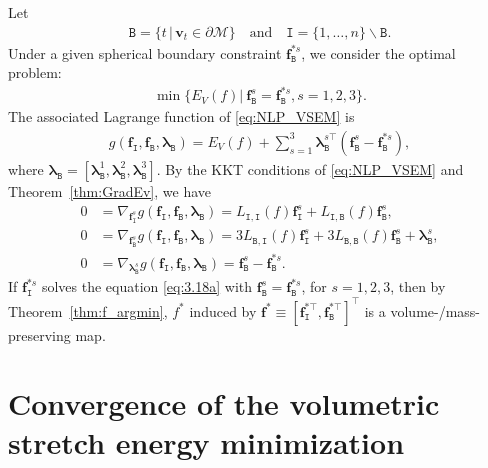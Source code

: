 \documentclass[onefignum,onetabnum]{siamonline220329}
\numberwithin{equation}{section}
\def\f{\mathbf{f}}
\def\bv{\mathbf{v}}
\def\I{\mathtt{I}}
\def\B{\mathtt{B}}
\def\blam{{\boldsymbol{\lambda}}}
\begin{document}
\begin{sloppypar}
Let
\begin{align*}
\mathtt{B} = \{t \,|\, \bv_t\in\partial\mathcal{M}\}\quad\text{and}\quad \mathtt{I} = \{1, \ldots, n\} \backslash\mathtt{B}.
\end{align*}
Under a given spherical boundary constraint $\f^{*s}_{\B}$, we consider the optimal problem:
\begin{align}\label{eq:NLP_VSEM}
    \min\{E_V(f)\rvert\  \f^s_\B = \f^{*s}_{\B}, s=1, 2, 3\}.
\end{align}
The associated Lagrange function of \eqref{eq:NLP_VSEM} is
\begin{align*}
    g(\f_{\I}, \f_{\B}, \blam_{\B}) = E_V(f) + \sum_{s=1}^3\blam_{\B}^{s\top} (\f^s_{\B} - \f^{*s}_{\B}),
\end{align*}
where $\blam_{\B}=[\blam_{\B}^1, \blam_{\B}^2, \blam_{\B}^3]$.
By the KKT conditions of \eqref{eq:NLP_VSEM} and Theorem~\ref{thm:GradEv}, we have
\begin{subequations}
\begin{align}
    0 &= \nabla_{\f^s_{\I}} g(\f_{\I}, \f_{\B}, \blam_{\B}) = L_{\I,\I}(f) \f^s_{\I} + L_{\I,\B}(f) \f^s_{\B},\label{eq:3.18a}\\
    0&= \nabla_{\f^s_{\B}} g(\f_{\I}, \f_{\B}, \blam_{\B}) = 3L_{\B,\I}(f) \f^s_{\I} + 3L_{\B,\B}(f) \f^s_{\B} + \blam^s_{\B},\\
    0&= \nabla_{\blam^s_{\B}} g(\f_{\I}, \f_{\B}, \blam_{\B}) = \f^s_{\B} - \f^{*s}_{\B}.
\end{align}
\end{subequations}
If $\f^{*s}_{\I}$ solves the equation \eqref{eq:3.18a} with $\f^s_{\B}=\f^{*s}_{\B}$, for $s=1, 2, 3$, then by Theorem~\ref{thm:f_argmin}, $f^{*}$ induced by $\f^{*} \equiv [\f^{*\top}_{\I}, \f^{*\top}_{\B}]^{\top}$ is a volume-/mass-preserving map.

\section{Convergence of the volumetric stretch energy minimization}
\label{sec:4}


\end{sloppypar}
\end{document}
